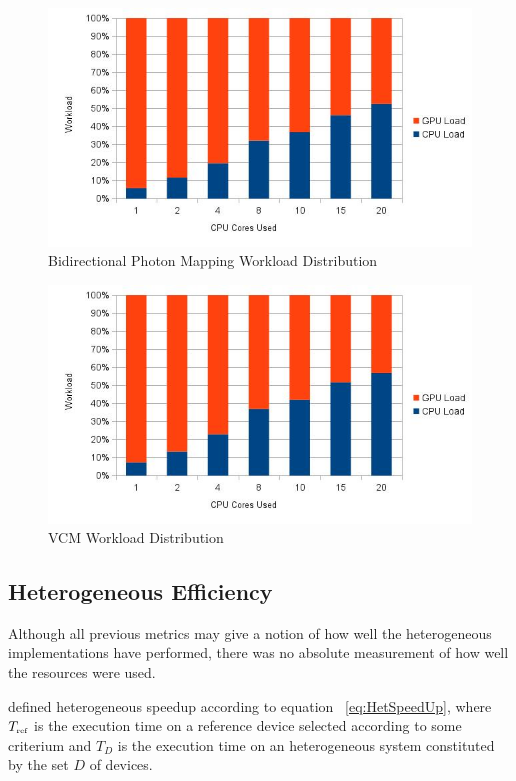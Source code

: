 \begin{figure}[H]
\centering
\includegraphics[width=0.8\linewidth]{img/bpmwl.jpg}
\caption{\label{img:bpmwl} Bidirectional Photon Mapping Workload Distribution}
\end{figure}

\begin{figure}[H]
\centering
\includegraphics[width=0.8\linewidth]{img/vcmwl.jpg}
\caption{\label{img:vcmwl} VCM Workload Distribution}
\end{figure}

\subsection{\label{sec:hefficiency} Heterogeneous Efficiency}


Although all previous metrics may give a notion of how well the heterogeneous implementations have performed, there was no absolute measurement of how well the resources were used.

\cite{Chamberlain98} defined heterogeneous speedup according to equation ~\ref{eq:HetSpeedUp}, where $T_{\mbox{\tiny ref}}$ is the execution time on a reference device selected according to some criterium and $T_D$ is the execution time on an heterogeneous system constituted by the set $D$ of devices.

